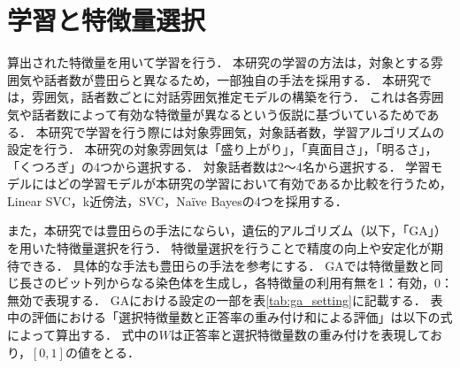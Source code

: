 
\section{学習と特徴量選択}

算出された特徴量を用いて学習を行う．
本研究の学習の方法は，対象とする雰囲気や話者数が豊田らと異なるため，一部独自の手法を採用する．
本研究では，雰囲気，話者数ごとに対話雰囲気推定モデルの構築を行う．
これは各雰囲気や話者数によって有効な特徴量が異なるという仮説に基づいているためである．
本研究で学習を行う際には対象雰囲気，対象話者数，学習アルゴリズムの設定を行う．
本研究の対象雰囲気は「盛り上がり」，「真面目さ」，「明るさ」，「くつろぎ」の4つから選択する．
対象話者数は2〜4名から選択する．
学習モデルにはどの学習モデルが本研究の学習において有効であるか比較を行うため，Linear SVC，k近傍法，SVC，Naïve Bayesの4つを採用する．

また，本研究では豊田らの手法にならい，遺伝的アルゴリズム（以下，「GA」）を用いた特徴量選択を行う．
特徴量選択を行うことで精度の向上や安定化が期待できる．
具体的な手法も豊田らの手法を参考にする．
GAでは特徴量数と同じ長さのビット列からなる染色体を生成し，各特徴量の利用有無を1：有効，0：無効で表現する．
GAにおける設定の一部を表\ref{tab:ga_setting}に記載する．
表中の評価における「選択特徴量数と正答率の重み付け和による評価」は以下の式によって算出する．
式中の$W$は正答率と選択特徴量数の重み付けを表現しており，$[0, 1]$の値をとる．

